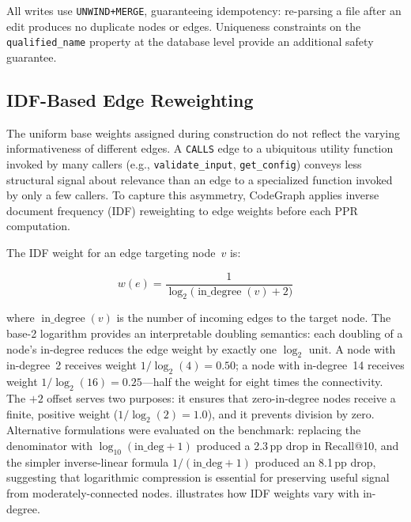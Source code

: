 All writes use \texttt{UNWIND+MERGE}, guaranteeing idempotency: re-parsing a file after an edit produces no duplicate nodes or edges. Uniqueness constraints on the \texttt{qualified\_name} property at the database level provide an additional safety guarantee.


\subsection{IDF-Based Edge Reweighting}
\label{sec:idf-reweighting}

The uniform base weights assigned during construction do not reflect the varying informativeness of different edges. A \texttt{CALLS} edge to a ubiquitous utility function invoked by many callers (e.g., \texttt{validate\_input}, \texttt{get\_config}) conveys less structural signal about relevance than an edge to a specialized function invoked by only a few callers. To capture this asymmetry, CodeGraph applies inverse document frequency (IDF) reweighting to edge weights before each PPR computation.

The IDF weight for an edge targeting node~$v$ is:

\begin{equation}
    w(e) = \frac{1}{\log_2\!\bigl(\operatorname{in\_degree}(v) + 2\bigr)}
    \label{eq:idf-weight}
\end{equation}

\noindent where $\operatorname{in\_degree}(v)$ is the number of incoming edges to the target node. The base-2 logarithm provides an interpretable doubling semantics: each doubling of a node's in-degree reduces the edge weight by exactly one $\log_2$ unit. A node with in-degree~2 receives weight $1/\log_2(4) = 0.50$; a node with in-degree~14 receives weight $1/\log_2(16) = 0.25$---half the weight for eight times the connectivity. The $+2$ offset serves two purposes: it ensures that zero-in-degree nodes receive a finite, positive weight ($1/\log_2(2) = 1.0$), and it prevents division by zero. Alternative formulations were evaluated on the benchmark: replacing the denominator with $\log_{10}(\text{in\_deg} + 1)$ produced a 2.3\,pp drop in Recall@10, and the simpler inverse-linear formula $1/(\text{in\_deg} + 1)$ produced an 8.1\,pp drop, suggesting that logarithmic compression is essential for preserving useful signal from moderately-connected nodes.  illustrates how IDF weights vary with in-degree.


